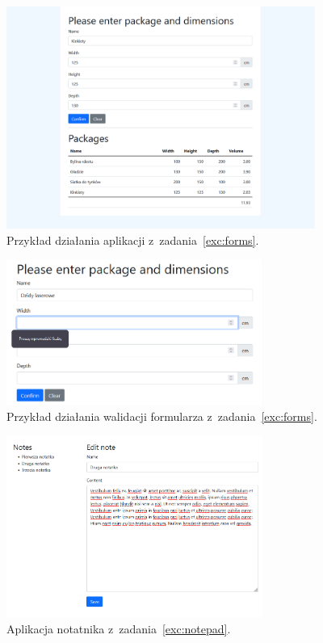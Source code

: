 \documentclass[12pt]{article}
\begin{document}
\begin{enumerate}
            \begin{figure}[p]
                \centering
                \includegraphics[width=0.9\textwidth]{lista-2-2}
                \caption{Przykład działania aplikacji z~zadania~\ref{exc:forms}.}
                \label{fig:forms}
            \end{figure}

            \begin{figure}[p]
                \centering
                \includegraphics[width=0.75\textwidth]{lista-2-2-blad}
                \caption{Przykład działania walidacji formularza z~zadania~\ref{exc:forms}.}
                \label{fig:forms-error}
            \end{figure}

            \begin{figure}[p]
                \centering
                \includegraphics[width=0.75\textwidth]{lista-2-3}
                \caption{Aplikacja notatnika z~zadania~\ref{exc:notepad}.}
                \label{fig:notepad}
            \end{figure}

    \end{enumerate}
\end{document}
